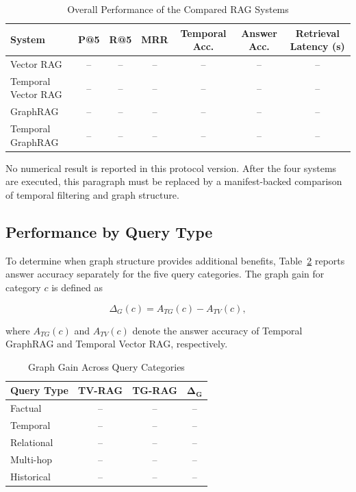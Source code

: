 \documentclass[conference]{IEEEtran}
\numberwithin{equation}{section}
\begin{document}
\begin{table}[htbp]
\caption{Overall Performance of the Compared RAG Systems}
\label{tab:overall_results}
\centering
\begin{tabular}{lcccccc}
\hline
\textbf{System} & \textbf{P@5} & \textbf{R@5} & \textbf{MRR} & \textbf{Temporal Acc.} & \textbf{Answer Acc.} & \textbf{Retrieval Latency (s)} \\
\hline
Vector RAG          & -- & -- & -- & -- & -- & -- \\
Temporal Vector RAG & -- & -- & -- & -- & -- & -- \\
GraphRAG            & -- & -- & -- & -- & -- & -- \\
Temporal GraphRAG   & -- & -- & -- & -- & -- & -- \\
\hline
\end{tabular}
\end{table}

No numerical result is reported in this protocol version. After the four systems are executed, this paragraph must be replaced by a manifest-backed comparison of temporal filtering and graph structure.

\subsection{Performance by Query Type}

To determine when graph structure provides additional benefits, Table~\ref{tab:graph_gain} reports answer accuracy separately for the five query categories. The graph gain for category $c$ is defined as

\begin{equation}
\Delta_G(c)=A_{TG}(c)-A_{TV}(c),
\label{eq:graph_gain}
\end{equation}

where $A_{TG}(c)$ and $A_{TV}(c)$ denote the answer accuracy of Temporal GraphRAG and Temporal Vector RAG, respectively.

\begin{table}[!htbp]
\caption{Graph Gain Across Query Categories}
\label{tab:graph_gain}
\centering
\begin{tabular}{lccc}
\hline
\textbf{Query Type} & \textbf{TV-RAG} & \textbf{TG-RAG} & $\boldsymbol{\Delta_G}$ \\
\hline
Factual    & -- & -- & -- \\
Temporal   & -- & -- & -- \\
Relational & -- & -- & -- \\
Multi-hop  & -- & -- & -- \\
Historical & -- & -- & -- \\
\hline
\end{tabular}
\end{table}
\end{document}
